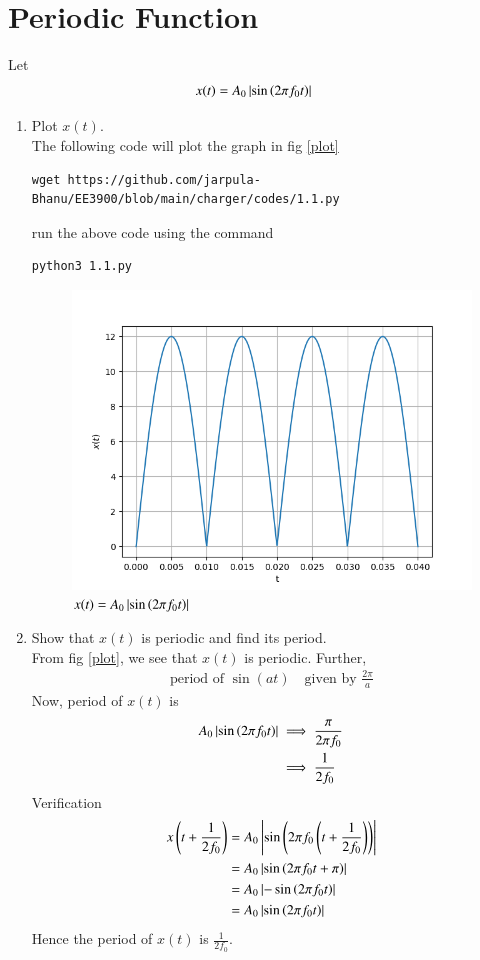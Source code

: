 \documentclass[journal,12pt,twocolumn]{IEEEtran}
\renewcommand\thesection{\arabic{section}}
\begin{document}
\section{Periodic Function}
Let
\begin{align}
	x(t) &= A_0\left\vert\sin\left(2\pi f_0 t\right)\right\vert
	\label{eq:10-orig-diff-def}
\end{align}
\begin{enumerate}[label=\thesection.\arabic*
,ref=\thesection.\theenumi]
\item Plot $x(t)$.\\
\solution The following code will plot the graph in fig \eqref{plot}
\begin{lstlisting}
wget https://github.com/jarpula-Bhanu/EE3900/blob/main/charger/codes/1.1.py
\end{lstlisting}
run the above code using the command
\begin{lstlisting}
python3 1.1.py
\end{lstlisting}
\begin{figure}[!ht]
	\includegraphics[width=\columnwidth]{./figs/1.1.png}
	\caption{$x(t) = A_0\left\vert\sin\left(2\pi f_0 t\right)\right\vert$}
	\label{plot}
\end{figure}
\item Show that $x(t)$ is periodic and find its period.\\
\solution From  fig \eqref{plot}, we see that  $x(t)$ is periodic. Further,
\begin{align}
	\text{period of } \sin(at) \quad \text{given by } \frac{2\pi}{a}
\end{align}
Now, period of $x(t)$ is 
\begin{align}
	A_0\left\vert\sin\left(2\pi f_0 t\right)\right\vert &\implies \frac{\pi}{2\pi f_0}\\
	&\implies \frac{1}{2f_0}
\end{align}
Verification
\begin{align}
	x\left(t+\frac{1}{2f_0}\right) &= A_0\left\vert\sin\left(2\pi f_0 \left(t+\frac{1}{2f_0}\right)\right)\right\vert\\
	&= A_0\left\vert\sin\left(2\pi f_0 t+ \pi\right)\right\vert\\
	&= A_0\left\vert-\sin\left(2\pi f_0 t\right)\right\vert\\
	&= A_0\left\vert\sin\left(2\pi f_0 t\right)\right\vert
\end{align}
Hence the period of $x(t)$ is $\frac{1}{2f_0}$.
\end{enumerate}
\end{document}
